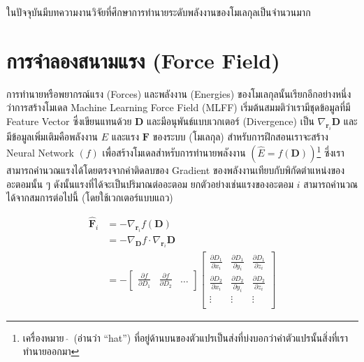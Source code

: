 ในปัจจุบันมีบทความงานวิจัยที่ศึกษาการทำนายระดับพลังงานของโมเลกุลเป็นจำนวนมาก\autocite{pereira2017,stuke2019,chang2019,rahaman2020,moore2022,ye2022}

\section{การจำลองสนามแรง (Force Field)}
\label{sec:model_ff}

การทำนายหรือพยากรณ์แรง (Forces) และพลังงาน (Energies) ของโมเลกุลนั้นเรียกอีกอย่างหนึ่งว่าการสร้างโมเดล Machine Learning Force Field (MLFF) เริ่มต้นสมมติว่าเรามีชุดข้อมูลที่มี Feature Vector ซึ่งเขียนแทนด้วย $\bm{D}$ และมีอนุพันธ์แบบเวกเตอร์ (Divergence) เป็น $\nabla_{\bm{r}_{i}} \bm{D}$ และมีข้อมูลเพิ่มเติมคือพลังงาน $E$ และแรง $\bm{F}$ ของระบบ (โมเลกุล) สำหรับการฝึกสอนเราจะสร้าง Neural Network $(f)$ เพื่อสร้างโมเดลสำหรับการทำนายพลังงาน $(\hat{E} = f(\bm{D}))$\footnote{เครื่องหมาย\, $\hat{}$\, (อ่านว่า \enquote{hat}) ที่อยู่ด้านบนของตัวแปรเป็นส่งที่บ่งบอกว่าค่าตัวแปรนั้นสิ่งที่เราทำนายออกมา} ซึ่งเราสามารถคำนวณแรงได้โดยตรงจากค่าติดลบของ Gradient ของพลังงานเทียบกับพิกัดตำแหน่งของอะตอมนั้น ๆ ดังนั้นแรงที่ได้จะเป็นปริมาณต่ออะตอม ยกตัวอย่างเช่นแรงของอะตอม $i$ สามารถคำนวณได้จากสมการต่อไปนี้ (โดยใช้เวกเตอร์แบบแถว)

\begin{align}\label{eq:force_pred}
    \hat{\bm{F}}_i & = - \nabla_{\bm{r}_{i}} f(\bm{D})                                                                                                   \\
                   & = - \nabla_{\bm{D}} f \cdot \nabla_{\bm{r}_{i}} \bm{D}                                                                              \\
                   & = - \begin{bmatrix}
                             \frac{\partial f}{\partial D_{1}} & \frac{\partial f}{\partial D_{2}} & \dots
                         \end{bmatrix}
    \begin{bmatrix}
        \frac{\partial D_{1}}{\partial x_{i}} & \frac{\partial D_{1}}{\partial y_i} &
        \frac{\partial D_{1}}{\partial z_i}                                                  \\
        \frac{\partial D_{2}}{\partial x_{i}} & \frac{\partial D_{2}}{\partial y_i} &
        \frac{\partial D_{2}}{\partial z_i}                                                  \\
        \vdots                                & \vdots                              & \vdots \\
    \end{bmatrix}
\end{align}

